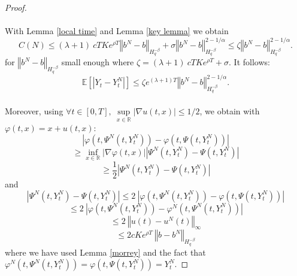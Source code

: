 \documentclass[12pt]{article}
\newcommand{\norme}[1]{\left\Vert #1\right\Vert}
\newcommand{\R}{\mathbb{R}}
\newcommand{\E}{\mathbb{E}}
\begin{document}
\begin{proof}
    \paragraph{}
    With Lemma \ref{local time} and Lemma \ref{key lemma} we obtain \begin{equation*}
    C(N) \leq (\lambda + 1)\ cTKe^{\rho T}\norme{b^N-b}_{H^{-\beta}_{q}} + \sigma\norme{b^N-b}_{H^{-\beta}_{q}}^{2-1/\alpha} \leq \zeta \norme{b^N-b}_{H^{-\beta}_{q}}^{2-1/\alpha}.
    \end{equation*}   
    for $\norme{b^N-b}_{H^{-\beta}_{q}}$ small enough where $\zeta = (\lambda + 1)\ cTKe^{\rho T} + \sigma $. It follows:
    \begin{equation}\label{gronfinal}
    \E\left[\left|Y_t-Y_t^N\right|\right] \leq \zeta e^{(\lambda + 1)T} \norme{b^N-b}_{H^{-\beta}_{q}}^{2-1/\alpha}.
    \end{equation}
    
    \paragraph{}
    Moreover, using $\forall t \in[0,T],\ \underset{x\in\R}{\sup}\left|\nabla u(t,x)\right| \leq 1/2$, we obtain with $\varphi(t,x)=x+u(t,x)$:
    \begin{equation*}
    \left|\varphi\left(t,\Psi^N\left(t,Y_t^N\right)\right)-\varphi\left(t,\Psi\left(t,Y_t^N\right)\right)\right| 
    \end{equation*}
    \begin{equation*}
    \geq \underset{x\in\R}{\inf}\left|\nabla\varphi(t,x)\right|
    \left|\Psi^N\left(t,Y_t^N\right)-\Psi\left(t,Y_t^N\right)\right|
    \end{equation*}
    \begin{equation*}
    \geq \frac{1}{2} \left|\Psi^N\left(t,Y_t^N\right)-\Psi\left(t,Y_t^N\right)\right|
    \end{equation*}    
    and 
    \begin{equation*}
    \left|\Psi^N\left(t,Y_t^N\right)-\Psi\left(t,Y_t^N\right)\right|\leq 2\ \left|\varphi\left(t,\Psi^N\left(t,Y_t^N\right)\right)-\varphi\left(t,\Psi\left(t,Y_t^N\right)\right)\right|
    \end{equation*}   
    \begin{equation*}
    \leq 2\ \left|\varphi\left(t,\Psi^N\left(t,Y_t^N\right)\right)-\varphi^N\left(t,\Psi^N\left(t,Y_t^N\right)\right)\right|
    \end{equation*}   
    \begin{equation*}
    \leq 2\ \norme{u(t)-u^N(t)}_\infty
    \end{equation*} 
    \begin{equation}\label{other}
    \leq 2cKe^{\rho T}\ \norme{b-b^N}_{H^{-\beta}_q}
    \end{equation} 
    where we have used Lemma \ref{morrey} and the fact that $\varphi^N\left(t,\Psi^N\left(t,Y_t^N\right)\right)=\varphi\left(t,\Psi\left(t,Y_t^N\right)\right) = Y_t^N$. 
    

\end{proof}
\end{document}
